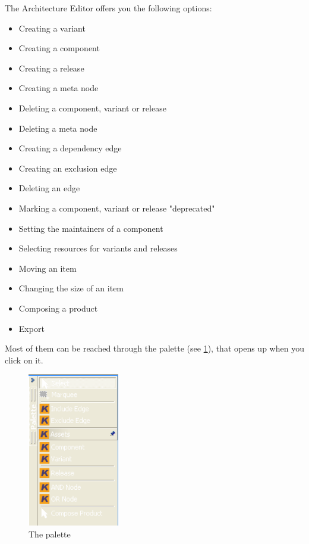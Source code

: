 The Architecture Editor offers you the following options:
\begin{itemize}
	\item Creating a variant
	\item Creating a component
	\item Creating a release
	\item Creating a meta node
	\item Deleting a component, variant or release
	\item Deleting a meta node
	\item Creating a dependency edge
	\item Creating an exclusion edge
	\item Deleting an edge
	\item Marking a component, variant or release "deprecated"
	\item Setting the maintainers of a component
	\item Selecting resources for variants and releases
	\item Moving an item
	\item Changing the size of an item
	\item Composing a product
	\item Export
\end{itemize}

Most of them can be reached through the palette (see \ref{palette}), that opens up when you click on it.

\begin{figure}[h!]
\begin{center}
\includegraphics[width=4cm]{palette.png}
   \caption{The palette}
\label{palette}
\end{center}
\end{figure}\par


